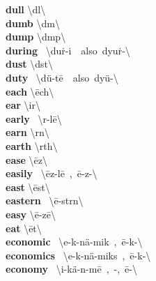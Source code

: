 \documentclass[10pt,a4paper]{article}
\begin{document}
\begin{multicols}{2}
\textbf{ dull }\quad \textbackslash \textprimstress d\textschwa l\textbackslash \\
\textbf{ dumb }\quad \textbackslash \textprimstress d\textschwa m\textbackslash \\
\textbf{ dump }\quad \textbackslash \textprimstress d\textschwa mp\textbackslash \\
\textbf{ during }\quad \ \textbackslash \textprimstress du\. r-i\engma \ \ also\ \textprimstress dyu\. r-\textbackslash \\
\textbf{ dust }\quad \textbackslash \textprimstress d\textschwa st\textbackslash \\
\textbf{ duty }\quad \ \textbackslash \textprimstress d\"{u}-t\={e}\ \ also\ \textprimstress dy\"{u}-\textbackslash \\
\textbf{ each }\quad \textbackslash \textprimstress \={e}ch\textbackslash \\
\textbf{ ear }\quad \textbackslash \textprimstress ir\textbackslash \\
\textbf{ early }\quad \ \textbackslash \textprimstress \textschwa r-l\={e}\textbackslash \\
\textbf{ earn }\quad \textbackslash \textprimstress \textschwa rn\textbackslash \\
\textbf{ earth }\quad \textbackslash \textprimstress \textschwa rth\textbackslash \\
\textbf{ ease }\quad \textbackslash \textprimstress \={e}z\textbackslash \\
\textbf{ easily }\quad \ \textbackslash \textprimstress \={e}z-l\={e}\ ,\ \textprimstress \={e}-z\textschwa -\textbackslash \\
\textbf{ east }\quad \textbackslash \textprimstress \={e}st\textbackslash \\
\textbf{ eastern }\quad \ \textbackslash \textprimstress \={e}-st\textschwa rn\textbackslash \\
\textbf{ easy }\quad \textbackslash \textprimstress \={e}-z\={e}\textbackslash \\
\textbf{ eat }\quad \textbackslash \textprimstress \={e}t\textbackslash \\
\textbf{ economic }\quad \ \textbackslash \textsecstress e-k\textschwa -\textprimstress n\"{a}-mik\ ,\ \textsecstress \={e}-k\textschwa -\textbackslash \\
\textbf{ economics }\quad \ \textbackslash \textsecstress e-k\textschwa -\textprimstress n\"{a}-miks\ ,\ \textsecstress \={e}-k\textschwa -\textbackslash \\
\textbf{ economy }\quad \ \textbackslash i-\textprimstress k\"{a}-n\textschwa -m\={e}\ ,\ \textschwa -,\ \={e}-\textbackslash \\

\end{multicols}
\end{document}
